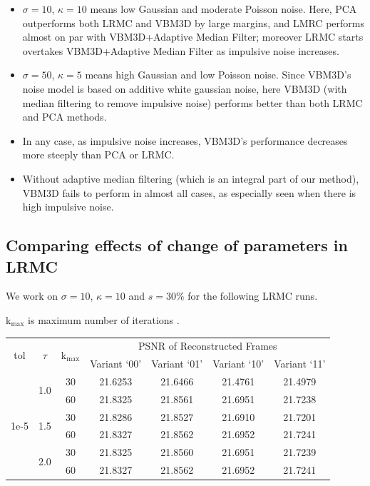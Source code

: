 \documentclass[fleqn, 11pt]{article}
\begin{document}
\begin{itemize}
    \item $\sigma = 10$, $\kappa = 10$ means low Gaussian and moderate Poisson noise. Here, PCA outperforms both LRMC and VBM3D by large margins, and LMRC performs almost on par with VBM3D+Adaptive Median Filter; moreover LRMC starts overtakes VBM3D+Adaptive Median Filter as impulsive noise increases.   
    
    \item $\sigma = 50$, $\kappa = 5$ means high Gaussian and low Poisson noise. Since VBM3D's noise model is based on additive white gaussian noise, here VBM3D (with median filtering to remove impulsive noise) performs better than both LRMC and PCA methods.
    
    \item In any case, as impulsive noise increases, VBM3D's performance decreases more steeply than PCA or LRMC. 
    
    \item Without adaptive median filtering (which is an integral part of our method), VBM3D fails to perform in almost all cases, as especially seen when there is high impulsive noise.
\end{itemize}

\newpage
\subsection*{Comparing effects of change of parameters in LRMC}

We work on $\sigma = 10$, $\kappa = 10$ and $s = 30\%$ for the following LRMC runs.

k$_\text{max}$ is maximum number of iterations .

\begin{table}[H]
    \centering
    \begin{tabular}{||c|c|c||c|c|c|c||}
         \hline
         \multirow{2}{*}{tol} & \multirow{2}{*}{$\tau$} & \multirow{2}{*}{k$_\text{max}$} & \multicolumn{4}{c||}{PSNR of Reconstructed Frames} \\
         \cline{4-7}
         & & & Variant `00' & Variant `01' & Variant `10' & Variant `11' \\
         \hline
         \multirow{6}{*}{1e-5} & \multirow{2}{*}{1.0} & 30 & 21.6253 & 21.6466 & 21.4761 & 21.4979 \\
         \cline{3-7}
          & & 60 & 21.8325 & 21.8561 & 21.6951 & 21.7238 \\
         \cline{3-7}
          & \multirow{2}{*}{1.5} & 30 & 21.8286 & 21.8527 & 21.6910 & 21.7201 \\
         \cline{3-7}
          & & 60 & 21.8327 & 21.8562 & 21.6952 & 21.7241 \\
         \cline{3-7}
          & \multirow{2}{*}{2.0} & 30 & 21.8325 & 21.8560 & 21.6951 & 21.7239 \\
         \cline{3-7}
          & & 60 & 21.8327 & 21.8562 & 21.6952 & 21.7241 \\
         \hline
    \end{tabular}
\end{table}
\end{document}
